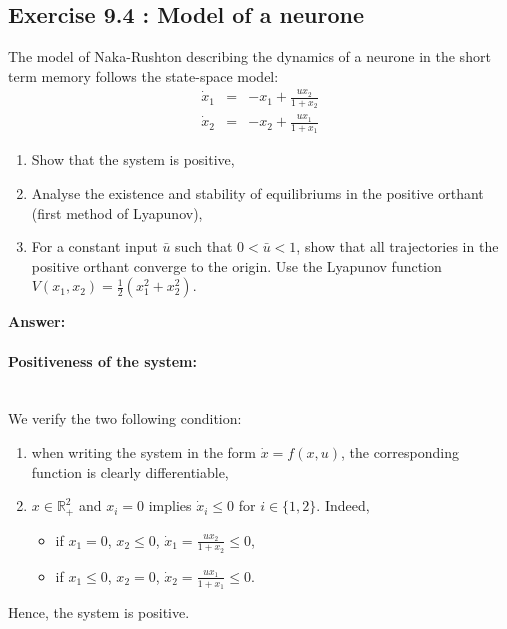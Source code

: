 \subsection*{Exercise 9.4 : Model of a neurone}
The model of Naka-Rushton describing the dynamics of a neurone in the short term memory follows the state-space model:
$$
\begin{array}{rcl}
\dot{x}_1 &=& -x_1 +\frac{ux_2}{1+x_2}\\
\dot{x}_2 &=& -x_2 +\frac{ux_1}{1+x_1}
\end{array}
$$

\begin{enumerate}
\item Show that the system is positive,
\item Analyse the existence and stability of equilibriums in the positive orthant (first method of Lyapunov),
\item For a constant input $\bar{u}$ such that $0<\bar{u}<1$, show that all trajectories in the positive orthant converge to the origin. Use the Lyapunov function $V(x_1,x_2)=\frac{1}{2}(x_1^2+x_2^2)$.
\end{enumerate}

\textbf{Answer: }~\\

\paragraph{Positiveness of the system: }~\\
We verify the two following condition:
\begin{enumerate}
\item when writing the system in the form $\dot{x}=f(x,u)$, the corresponding function is clearly differentiable,
\item $x\in \mathbb{R}^2_+$ and $x_i=0$ implies $\dot{x}_i\leq 0$ for $i\in \{1,2\}$. Indeed,
\begin{itemize}
\item if $x_1=0$, $x_2\leq 0$, $\dot{x}_1=\frac{ux_2}{1+x_2}\leq 0$,
\item if $x_1\leq 0$, $x_2= 0$, $\dot{x}_2=\frac{ux_1}{1+x_1}\leq 0$.
\end{itemize}
\end{enumerate}
Hence, the system is positive.

